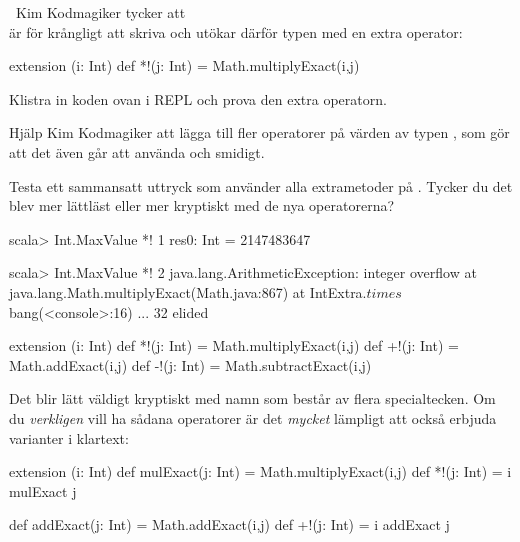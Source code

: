 {\QUESTEND





\QUESTBEGIN

\Task\Uberkurs \what~Kim Kodmagiker tycker att \\ är för krångligt att skriva och utökar därför typen  med en extra operator:

\begin{Code}
extension (i: Int) def *!(j: Int) = Math.multiplyExact(i,j)
\end{Code}

\Subtask Klistra in koden ovan i REPL och prova den extra operatorn.

\Subtask Hjälp Kim Kodmagiker att lägga till fler operatorer på värden av typen , som gör att det även går att använda  och  smidigt.

\Subtask Testa ett sammansatt uttryck som använder alla extrametoder på . Tycker du det blev mer lättläst eller mer kryptiskt med de nya operatorerna?

\SOLUTION

\TaskSolved \what

\SubtaskSolved

\begin{REPL}
scala> Int.MaxValue *! 1
res0: Int = 2147483647

scala> Int.MaxValue *! 2
java.lang.ArithmeticException: integer overflow
  at java.lang.Math.multiplyExact(Math.java:867)
  at IntExtra.$times$bang(<console>:16)
  ... 32 elided

\end{REPL}


\SubtaskSolved

\begin{Code}
extension (i: Int) 
  def *!(j: Int) = Math.multiplyExact(i,j)
  def +!(j: Int) = Math.addExact(i,j)
  def -!(j: Int) = Math.subtractExact(i,j)
\end{Code}


\SubtaskSolved Det blir lätt väldigt kryptiskt med namn som består av flera specialtecken. Om du \emph{verkligen} vill ha sådana operatorer är det \emph{mycket} lämpligt att också erbjuda varianter i klartext:
\begin{Code}
extension (i: Int)
  def mulExact(j: Int) = Math.multiplyExact(i,j)
  def *!(j: Int) = i mulExact j

  def addExact(j: Int) = Math.addExact(i,j)
  def +!(j: Int) = i addExact j


\end{Code}}
